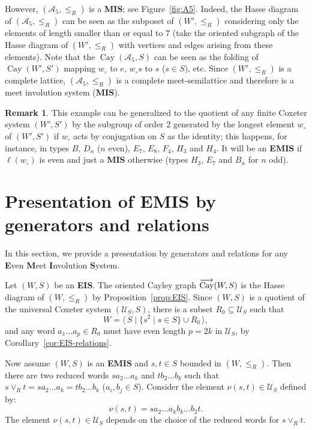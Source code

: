 \documentclass[A4paper, oneside]{amsart}
\newcommand{\id}{\textit{e}}
\newcommand{\mpair}[1]{\langle\, #1\,\rangle}  %
\newcommand{\Cay}{\operatorname{Cay}}
\newcommand{\oCay}{%
  \operatorname{%
    \overset{\smash{\raisebox{-0.45ex}{$\longrightarrow$}}}{\textnormal{Cay}}%
  }%
}
\newcommand{\U}{\mathcal{U}}
\newcommand{\EIS}{\textnormal{\bf EIS}\xspace}
\newcommand{\EMIS}{\textnormal{\bf EMIS}\xspace}
\newcommand{\MIS}{\textnormal{\bf MIS}\xspace}
\theoremstyle{definition}
\newtheorem{rem}[thm]{Remark}
\begin{document}
However, $(\mathcal A_5,\leq_{R})$ is a \MIS; see Figure~\ref{fig:A5}. Indeed, the Hasse diagram of ${{(\mathcal A_5,\leq_{R})}}$ can be seen as the subposet of $(W',\leq_R)$ considering only the elements of length smaller than or equal to $7$ (take the oriented subgraph of the Hasse diagram of $(W',\leq_{R})$ with vertices and edges arising from these elements). Note that the $\Cay(\mathcal A_5,S)$ can be seen as the folding  of $\Cay(W',S')$ mapping $w_\circ$ to $\id$, $w_\circ s$ to $s$ ($s\in S$), etc. Since $(W',\leq_R)$ is a complete lattice, $(\mathcal A_5,\leq_{R})$ is a complete meet-semilattice and therefore is a meet involution system (\MIS).



\begin{rem} This example can be generalized to the quotient of any finite Coxeter system $(W',S')$ by the subgroup of order $2$ generated by the longest element $w_\circ$ of $(W',S')$ if $w_\circ$ acts by conjugation on $S$ as the identity; this happens, for instance, in types $B$, $D_n$ ($n$ even), $E_7$, $E_8$, $F_4$, $H_3$ and $H_4$. It will be an \EMIS if $\ell(w_\circ)$ is even and just a \MIS otherwise (types $H_3$, $E_7$ and $B_n$ for $n$ odd). 
\end{rem}


\section{Presentation of \EMIS  by generators and relations}
\label{se:Presentation}
   In this section, we provide a presentation by generators and relations for any {\bf E}ven {\bf M}eet {\bf I}nvolution {\bf S}ystem. 

\smallskip
Let $(W,S)$ be an \EIS. The oriented Cayley graph $\oCay(W,S)$ is the Hasse diagram of $(W,\leq_R)$ by Proposition~\ref{prop:EIS}. Since $(W,S)$ is a quotient of the universal Coxeter system $(\U_S,S)$, there is a subset $R_0\subseteq\U_S$ such that 
$$
W=\mpair{S\mid \{s^2\mid s\in S\}\cup R_0},
$$
and any word $a_1\dots a_p\in R_0$ must have even length $p=2k$ in $\U_S$, by Corollary~\ref{cor:EIS-relations}. 
\smallskip

Now assume  $(W,S)$ is an  \EMIS and $s,t\in S$ bounded in $(W,\leq_R)$. Then there are two reduced words $sa_2\dots a_k$ and $tb_2\dots b_k$ such that $s\vee_Rt= sa_2\dots a_k=tb_2\dots b_k$ ($a_i,b_j\in S$).  Consider the element $\nu(s,t)\in \U_S$ defined by:
\begin{equation}
\label{eq:Relations}
\nu(s,t)=sa_2\dots a_kb_k\dots b_2t.
\end{equation}
The element $\nu(s,t)\in \U_S$ depends on the choice of the reduced words for $s\vee_R t$. 
\end{document}

